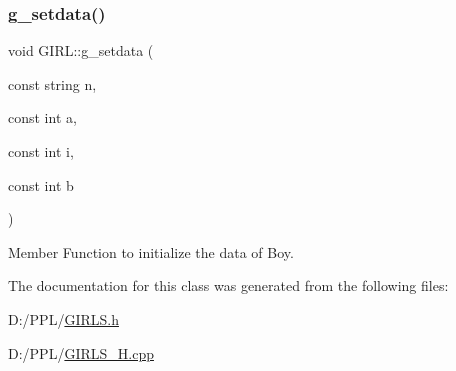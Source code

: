 \mbox{\label{class_g_i_r_l_a3a97308b7bb19f0e48e238779f80d261}} 
\subsubsection{\texorpdfstring{g\+\_\+setdata()}{g\_setdata()}}
{\footnotesize\ttfamily void G\+I\+R\+L\+::g\+\_\+setdata (\begin{DoxyParamCaption}\item[{const string}]{n,  }\item[{const int}]{a,  }\item[{const int}]{i,  }\item[{const int}]{b }\end{DoxyParamCaption})}



Member Function to initialize the data of Boy. 



The documentation for this class was generated from the following files\+:\begin{DoxyCompactItemize}
\item 
D\+:/\+P\+P\+L/\hyperlink{_g_i_r_l_s_8h}{G\+I\+R\+L\+S.\+h}\item 
D\+:/\+P\+P\+L/\hyperlink{_g_i_r_l_s___h_8cpp}{G\+I\+R\+L\+S\+\_\+\+H.\+cpp}\end{DoxyCompactItemize}
